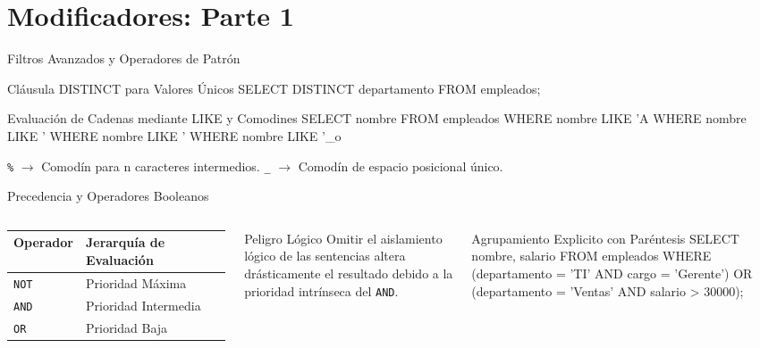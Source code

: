 \documentclass[12pt, aspectratio=169, UTF8]{beamer}
\begin{document}
\section{Modificadores: Parte 1}

\begin{frame}[fragile]{Filtros Avanzados y Operadores de Patrón}
  \begin{sqlbox}{Cláusula DISTINCT para Valores Únicos}
SELECT DISTINCT departamento FROM empleados;
  \end{sqlbox}
  \vspace{4pt}
  \begin{sqlbox}{Evaluación de Cadenas mediante LIKE y Comodines}
SELECT nombre FROM empleados 
WHERE nombre LIKE 'A%
WHERE nombre LIKE '%
WHERE nombre LIKE '%
WHERE nombre LIKE '_o%
  \end{sqlbox}
  \begin{center}
    \footnotesize
    \texttt{\%} $\rightarrow$ Comodín para n caracteres intermedios. \quad \texttt{\_} $\rightarrow$ Comodín de espacio posicional único.
  \end{center}
\end{frame}

\begin{frame}[fragile]{Precedencia y Operadores Booleanos}
  \begin{columns}[T]
      \small
      \renewcommand{\arraystretch}{1.2}
      \begin{tabular}{@{} l l @{}}
        \toprule
        \textbf{Operador} & \textbf{Jerarquía de Evaluación} \\
        \midrule
        \texttt{NOT} & Prioridad Máxima \\
        \texttt{AND} & Prioridad Intermedia \\
        \texttt{OR}  & Prioridad Baja \\
        \bottomrule
      \end{tabular}
      \vspace{10pt}
      \begin{alertblock}{Peligro Lógico}
        Omitir el aislamiento lógico de las sentencias altera drásticamente el resultado debido a la prioridad intrínseca del \texttt{AND}.
      \end{alertblock}
      \begin{sqlbox}{Agrupamiento Explicito con Paréntesis}
SELECT nombre, salario
FROM empleados
WHERE (departamento = 'TI' AND cargo = 'Gerente')
   OR (departamento = 'Ventas' AND salario > 30000);
      \end{sqlbox}
  \end{columns}
\end{frame}
\end{document}
